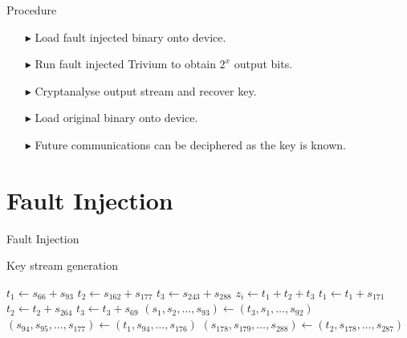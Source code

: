 \documentclass[10pt, compress]{beamer}
\begin{document}
    \begin{frame}{Procedure}
        \begin{itemize}[itemsep=0.5cm]
            \item[$\blacktriangleright$] Load fault injected binary onto device.
            \item[$\blacktriangleright$] Run fault injected Trivium to obtain $2^x$ output bits.
            \item[$\blacktriangleright$] Cryptanalyse output stream and recover key.
            \item[$\blacktriangleright$] Load original binary onto device.
            \item[$\blacktriangleright$] Future communications can be deciphered as the key is known.
        \end{itemize}
    \end{frame}

    \section{Fault Injection}

    \begin{frame}{Fault Injection}
        \begin{figure}
            
        \end{figure}
    \end{frame}

    \begin{frame}{Key stream generation}
        \begin{center}
            \begin{minipage}{\textwidth}
                \begin{algorithm}[H]
                    \begin{algorithmic}[1]
                         
                        \State $t_1 \gets s_{66} + s_{93}$
                        \State $t_2 \gets s_{162} + s_{177}$
                        \State $t_3 \gets s_{243} + s_{288}$
                        \State
                        \State $z_i \gets t_1 + t_2 + t_3$
                        \State
                        \State $t_1 \gets t_1 + s_{171}$
                        \State $t_2 \gets t_2 + s_{264}$
                        \State $t_3 \gets t_3 + s_{69}$
                        \State
                        \State $(s_1,s_2,\dots,s_{93}) \gets (t_3,s_1,\dots,s_{92})$ 
                        \State $(s_{94},s_{95},\dots,s_{177}) \gets (t_1,s_{94},\dots,s_{176})$ 
                        \State $(s_{178},s_{179},\dots,s_{288}) \gets (t_2,s_{178},\dots,s_{287})$ 
                        \EndFor
                    \end{algorithmic}
                \end{algorithm}
            \end{minipage}
        \end{center}
    \end{frame}
\end{document}
